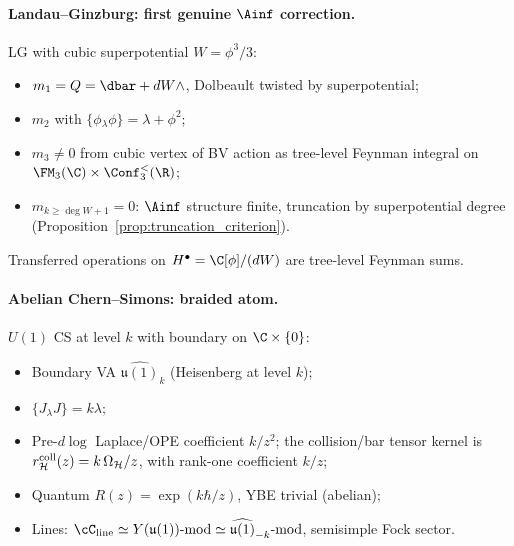 \paragraph{Landau--Ginzburg: first genuine $\Ainf$ correction.}
LG with cubic superpotential $W = \phi^3/3$:
\begin{itemize}
\item $m_1 = Q = \dbar + dW \wedge$, Dolbeault twisted by
 superpotential;
\item $m_2$ with $\{\phi {}_\lambda \phi\} = \lambda + \phi^2$;
\item $m_3 \neq 0$ from cubic vertex of BV action as tree-level
 Feynman integral on $\FM_3(\C) \times \Conf_3^{<}(\R)$;
\item $m_{k \geq \deg W + 1} = 0$: $\Ainf$ structure finite,
 truncation by superpotential degree
 (Proposition~\ref{prop:truncation_criterion}).
\end{itemize}
Transferred operations on $H^\bullet = \C[\phi]/(dW)$ are
tree-level Feynman sums.

\paragraph{Abelian Chern--Simons: braided atom.}
$U(1)$ CS at level $k$ with boundary on $\C \times \{0\}$:
\begin{itemize}
\item Boundary VA $\widehat{\mathfrak{u}(1)}_k$ (Heisenberg at
 level $k$);
\item $\{J {}_\lambda J\} = k\lambda$;
\item Pre-\textup{\(d\log\)} Laplace/OPE coefficient $k/z^2$;
 the collision/bar tensor kernel is
 $r^{\mathrm{coll}}_{\mathcal{H}}(z)=k\,\Omega_{\mathcal{H}}/z$, with rank-one
 coefficient $k/z$;
\item Quantum $R(z) = \exp(k\hbar/z)$, YBE trivial (abelian);
\item Lines: $\cC_{\mathrm{line}} \simeq Y(\mathfrak{u}(1))\text{-mod}
 \simeq \widehat{\mathfrak{u}(1)}_{-k}\text{-mod}$, semisimple
 Fock sector.
\end{itemize}

